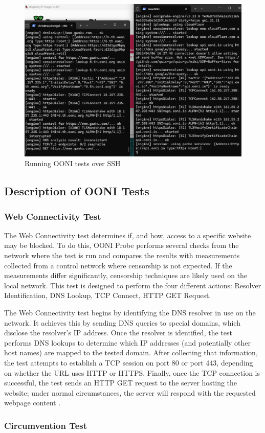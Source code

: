 \begin{figure} [H]
    \centering
    \includegraphics[width=0.5\linewidth]{RunningTestsSideBySideSSH.png}
    \caption{Running OONI tests over SSH}
    \label{fig:enter-label}
\end{figure}

\subsection{Description of OONI Tests}
\subsubsection{Web Connectivity Test}

The Web Connectivity test determines if, and how, access to a specific website may be blocked. To do this, OONI Probe performs several checks from the network where the test is run and compares the results with measurements collected from a control network where censorship is not expected. If the measurements differ significantly, censorship techniques are likely used on the local network. This test is designed to perform the four different actions: Resolver Identification, DNS Lookup, TCP Connect, HTTP GET Request.

The Web Connectivity test begins by identifying the DNS resolver in use on the network. It achieves this by sending DNS queries to special domains, which disclose the resolver’s IP address. Once the resolver is identified, the test performs DNS lookups to determine which IP addresses (and potentially other host names) are mapped to the tested domain. After collecting that information, the test attempts to establish a TCP session on port 80 or port 443, depending on whether the URL uses HTTP or HTTPS. Finally, once the TCP connection is successful, the test sends an HTTP GET request to the server hosting the website; under normal circumstances, the server will respond with the requested webpage content \cite{ooniConnectivityTest}.

\subsubsection{Circumvention Test}

